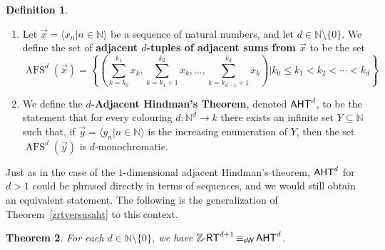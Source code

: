 \documentclass[11pt]{amsart}
\newcommand{\zrt}{\mathnormal{\mathbb Z\text{-}\mathsf{RT}}}
\newcommand{\aht}{\mathnormal{\mathsf{AHT}}}
\newcommand{\weiseq}{\mathop{\equiv_{\mathrm{s}\mathsf{W}}}}
\DeclareMathOperator{\afs}{AFS}
\newtheorem{theorem}{Theorem}%
\theoremstyle{definition}
\newtheorem{definition}[theorem]{Definition}
\begin{document}
\begin{definition}\hfill
\begin{enumerate}
\item Let $\vec{x}=\langle x_n\big|n\in\mathbb N\rangle$ be a sequence of natural numbers, and let $d\in\mathbb N\setminus\{0\}$. We define the set of {\bf adjacent $d$-tuples of adjacent sums from $\vec{x}$} to be the set
\begin{equation*}
\afs^d(\vec{x})=\left\{\left(\sum_{k=k_0}^{k_1} x_k,\sum_{k=k_1+1}^{k_2} x_k,\ldots,\sum_{k=k_{d-1}+1}^{k_d} x_k\right)\bigg|k_0\leq k_1<k_2<\cdots<k_d\right\}
\end{equation*}
\item We define the {\bf $d$-Adjacent Hindman's Theorem}, denoted $\aht^d$, to be the statement that for every colouring $d:\mathbb N^d\longrightarrow k$ there exists an infinite set $Y\subseteq\mathbb N$ such that, if $\vec{y}=\langle y_n\big|n\in\mathbb N\rangle$ is the increasing enumeration of $Y$, then the set $\afs^d(\vec{y})$ is $d$-monochromatic.
\end{enumerate}
\end{definition}

Just as in the case of the $1$-dimensional adjacent Hindman's theorem, $\aht^d$ for $d>1$  could be phrased directly in terms of sequences, and we would still obtain an equivalent statement. The following is the generalization of Theorem~\ref{zrtversusaht} to this context.

\begin{theorem}\label{higher-zrtversusaht}
For each $d\in\mathbb N\setminus\{0\}$, we have $\zrt^{d+1}\weiseq\aht^d$.
\end{theorem}
\end{document}
